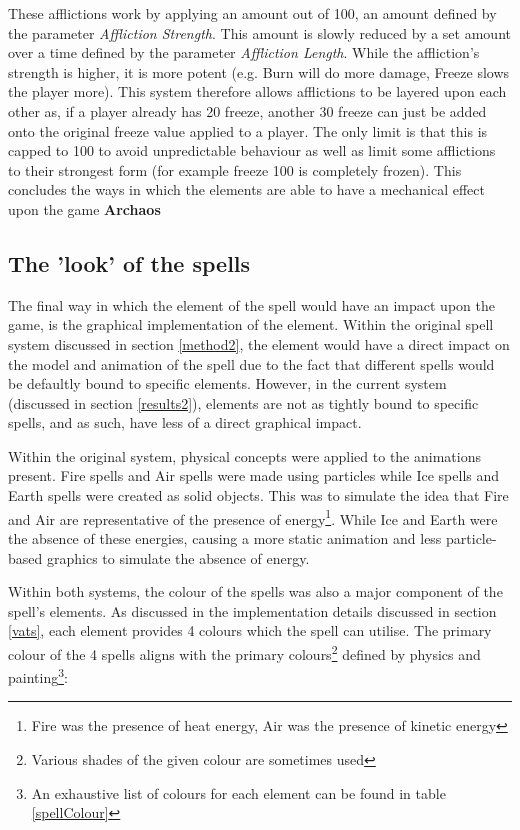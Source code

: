 \documentclass[12pt,a4paper]{report}
\begin{document}
These afflictions work by applying an amount out of 100, an amount defined by the parameter \textit{Affliction Strength}. This amount is slowly reduced by a set amount over a time defined by the parameter \textit{Affliction Length}. While the affliction's strength is higher, it is more potent (e.g. Burn will do more damage, Freeze slows the player more). This system therefore allows afflictions to be layered upon each other as, if a player already has 20 freeze, another 30 freeze can just be added onto the original freeze value applied to a player. The only limit is that this is capped to 100 to avoid unpredictable behaviour as well as limit some afflictions to their strongest form (for example freeze 100 is completely frozen). This concludes the ways in which the elements are able to have a mechanical effect upon the game \textbf{Archaos}

\subsection{The 'look' of the spells} \label{spellVisuals}

The final way in which the element of the spell would have an impact upon the game, is the graphical implementation of the element. Within the original spell system discussed in section \ref{method2}, the element would have a direct impact on the model and animation of the spell due to the fact that different spells would be defaultly bound to specific elements. However, in the current system (discussed in section \ref{results2}), elements are not as tightly bound to specific spells, and as such, have less of a direct graphical impact.

Within the original system, physical concepts were applied to the animations present. Fire spells and Air spells were made using particles while Ice spells and Earth spells were created as solid objects. This was to simulate the idea that Fire and Air are representative of the presence of energy\footnote{Fire was the presence of heat energy, Air was the presence of kinetic energy}. While Ice and Earth were the absence of these energies, causing a more static animation and less particle-based graphics to simulate the absence of energy.

Within both systems, the colour of the spells was also a major component of the spell's elements. As discussed in the implementation details discussed in section \ref{vats}, each element provides 4 colours which the spell can utilise. The primary colour of the 4 spells aligns with the primary colours\footnote{Various shades of the given colour are sometimes used} defined by physics and painting\footnote{An exhaustive list of colours for each element can be found in table \ref{spellColour}}:
\end{document}
